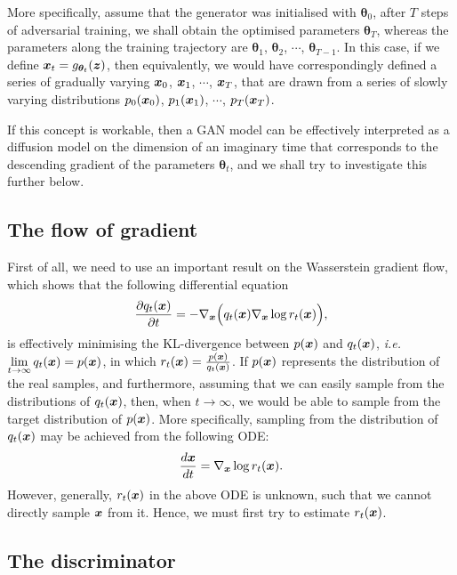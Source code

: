 More specifically, assume that the generator was initialised with $\bm{\theta}_0$, after $T$ steps of adversarial training, we shall obtain the optimised parameters $\bm{\theta}_T$, whereas the parameters along the training trajectory are $\bm{\theta}_1$, $\bm{\theta}_2$, $\cdots$, $\bm{\theta}_{T-1}$. In this case, if we define $\bm{x}_{t}=g_{\bm{\theta}_t}(\bm{z})$, then equivalently, we would have correspondingly defined a series of gradually varying $\bm{x}_0$, $\bm{x}_1$, $\cdots$, $\bm{x}_T$, that are drawn from a series of slowly varying distributions $p_0(\bm{x}_0)$, $p_1(\bm{x}_1)$, $\cdots$, $p_T(\bm{x}_T)$. 

If this concept is workable, then a GAN model can be effectively interpreted as a diffusion model on the dimension of an imaginary time that corresponds to the descending gradient of the parameters $\bm{\theta}_t$, and we shall try to investigate this further below.

\subsection{The flow of gradient}

First of all, we need to use an important result on the Wasserstein gradient flow, which shows that the following differential equation
\begin{equation}
    \label{eq:19.1}
    \frac{\partial q_t(\bm{x})}{\partial t}=-\nabla_{\bm{x}} \Big(q_t(\bm{x})\nabla_{\bm{x}}\log r_t(\bm{x})\Big),
\end{equation}
is effectively minimising the KL-divergence between $p(\bm{x})$ and $q_t(\bm{x})$, \emph{i.e.} $\lim\limits_{t\to\infty}q_t(\bm{x})=p(\bm{x})$, in which $r_t(\bm{x})=\frac{p(\bm{x})}{q_t(\bm{x})}$. If $p(\bm{x})$ represents the distribution of the real samples, and furthermore, assuming that we can easily sample from the distributions of $q_t(\bm{x})$, then, when $t\to\infty$, we would be able to sample from the target distribution of $p(\bm{x})$. More specifically, sampling from the distribution of $q_t(\bm{x})$ may be achieved from the following ODE:
\begin{equation}
    \label{eq:19.2}
    \frac{d\bm{x}}{dt}=\nabla_{\bm{x}} \log r_t(\bm{x}).
\end{equation}
However, generally, $r_t(\bm{x})$ in the above ODE is unknown, such that we cannot directly sample $\bm{x}$ from it. Hence, we must first try to estimate $r_t(\bm{x})$.

\subsection{The discriminator}

